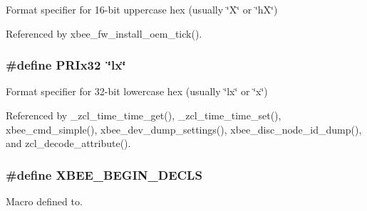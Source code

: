Format specifier for 16-\/bit uppercase hex (usually {\ttfamily \char`\"{}\-X\char`\"{}} or {\ttfamily \char`\"{}h\-X\char`\"{}}) 



Referenced by xbee\-\_\-fw\-\_\-install\-\_\-oem\-\_\-tick().

\hypertarget{group__hal_ga80ca66bcc9e366733f02c90ed4b0838c}{
\subsubsection[{P\-R\-Ix32}]{\setlength{\rightskip}{0pt plus 5cm}\#define P\-R\-Ix32~\char`\"{}lx\char`\"{}}}\label{group__hal_ga80ca66bcc9e366733f02c90ed4b0838c}


Format specifier for 32-\/bit lowercase hex (usually {\ttfamily \char`\"{}lx\char`\"{}} or {\ttfamily \char`\"{}x\char`\"{}}) 



Referenced by \-\_\-zcl\-\_\-time\-\_\-time\-\_\-get(), \-\_\-zcl\-\_\-time\-\_\-time\-\_\-set(), xbee\-\_\-cmd\-\_\-simple(), xbee\-\_\-dev\-\_\-dump\-\_\-settings(), xbee\-\_\-disc\-\_\-node\-\_\-id\-\_\-dump(), and zcl\-\_\-decode\-\_\-attribute().

\hypertarget{group__hal_ga336bff4f4a6012aacc4468132bbd3d7f}{
\subsubsection[{X\-B\-E\-E\-\_\-\-B\-E\-G\-I\-N\-\_\-\-D\-E\-C\-L\-S}]{\setlength{\rightskip}{0pt plus 5cm}\#define X\-B\-E\-E\-\_\-\-B\-E\-G\-I\-N\-\_\-\-D\-E\-C\-L\-S}}\label{group__hal_ga336bff4f4a6012aacc4468132bbd3d7f}


Macro defined to. 



